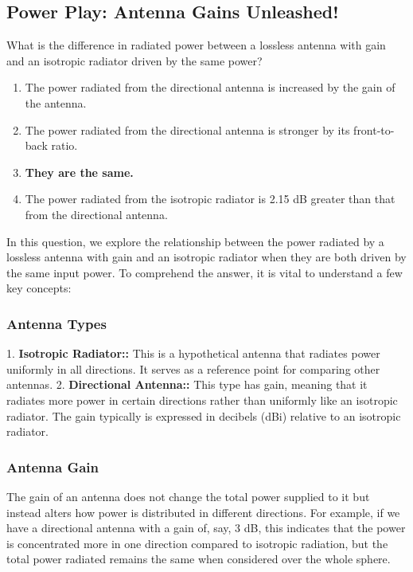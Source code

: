 \subsection{Power Play: Antenna Gains Unleashed!}

\begin{tcolorbox}[colback=gray!10, colframe=black, title=E9B07] What is the difference in radiated power between a lossless antenna with gain and an isotropic radiator driven by the same power?

\begin{enumerate}[label=\Alph*]
    \item The power radiated from the directional antenna is increased by the gain of the antenna.
    \item The power radiated from the directional antenna is stronger by its front-to-back ratio.
    \item \textbf{They are the same.}
    \item The power radiated from the isotropic radiator is 2.15 dB greater than that from the directional antenna.
\end{enumerate} \end{tcolorbox}

In this question, we explore the relationship between the power radiated by a lossless antenna with gain and an isotropic radiator when they are both driven by the same input power. To comprehend the answer, it is vital to understand a few key concepts:

\subsubsection{Antenna Types}
1. \textbf{Isotropic Radiator::} This is a hypothetical antenna that radiates power uniformly in all directions. It serves as a reference point for comparing other antennas.
2. \textbf{Directional Antenna::} This type has gain, meaning that it radiates more power in certain directions rather than uniformly like an isotropic radiator. The gain typically is expressed in decibels (dBi) relative to an isotropic radiator.

\subsubsection{Antenna Gain}
The gain of an antenna does not change the total power supplied to it but instead alters how power is distributed in different directions. For example, if we have a directional antenna with a gain of, say, 3 dB, this indicates that the power is concentrated more in one direction compared to isotropic radiation, but the total power radiated remains the same when considered over the whole sphere. 


